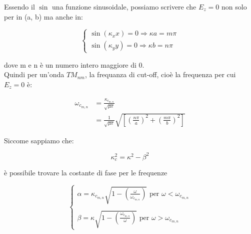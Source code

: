 Essendo il $\sin$ una funzione sinusoidale, possiamo scrivere che
$E_z = 0$ non solo per in (a, b) ma anche in: 

{
    \Large
    \begin{equation}
        \begin{cases}
            \sin(\kappa_x x) = 0 
            \Rightarrow 
            \kappa a = m \pi \\ 
            \sin(\kappa_y y) = 0 
            \Rightarrow 
            \kappa b = n \pi 
        \end{cases}
    \end{equation}
}

dove m e n è un numero intero maggiore di 0. \\ 

Quindi per un'onda $TM_{n m}$, la frequanza di cut-off, cioè 
la frequenza per cui $E_z = 0$ è: 


{
    \Large 
    \begin{equation}
        \begin{split}
            \omega_{c_{m,n}} 
            &= 
            \frac{\kappa_{c_{m,n}}}{\sqrt{\mu \varepsilon}} \\
            &= 
            \frac{1}{\sqrt{\mu \varepsilon}} \sqrt{[(\frac{n \pi}{a}) ^{2} + (\frac{m \pi}{b}) ^{2}]}    
        \end{split}
    \end{equation}
}

Siccome sappiamo che: 

{
    \Large 
    \begin{equation}
        \kappa_c ^{2} = \kappa^{2} - \beta^{2}
    \end{equation}
}

è possibile trovare la costante di fase per le frequenze 

{
    \Large 
    \begin{equation}
        \begin{cases}
            \alpha 
            = 
            \kappa_{c_{m,n}} \sqrt{1 - (\frac{\omega}{\omega_{c_{m,n}}})} 
            \text{  per } 
            \omega < \omega_{c_{m,n}}
            \\ \\
            \beta
            = 
            \kappa \sqrt{1 - (\frac{\omega_{c_{m,n}}}{\omega})} 
            \text{  per } 
            \omega > \omega_{c_{m,n}}
        \end{cases}
    \end{equation}
}

